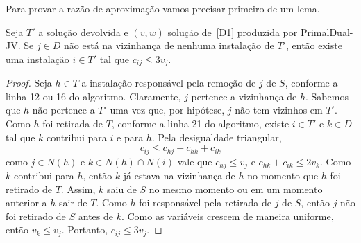 Para provar a razão de aproximação vamos precisar primeiro de um lema.
\begin{lemma}
    \label{lemma:3.5}
    Seja $T'$ a solução devolvida e $(v,w)$ solução de~\eqref{D1} produzida por {\sc PrimalDual-JV}. Se $j \in D$ não está na vizinhança de nenhuma instalação de $T'$, então existe uma instalação $i \in T'$ tal que $c_{ij} \leq 3v_j$.
\end{lemma}
\begin{proof}
    Seja $h \in T$ a instalação responsável pela remoção de $j$ de $S$, conforme a linha 12 ou 16 do algoritmo. Claramente, $j$ pertence a vizinhança de $h$. Sabemos que $h$ não pertence a $T'$ uma vez que, por hipótese, $j$ não tem vizinhos em $T'$. Como $h$ foi retirada de $T$, conforme a linha 21 do algoritmo, existe $i \in T'$ e $k \in D$ tal que $k$ contribui para $i$ e para $h$. Pela desigualdade triangular,
    \[c_{ij} \leq c_{hj} + c_{hk} + c_{ik}\]
    como $j \in N(h)$ e $k \in N(h) \cap N(i)$ vale que $c_{hj} \leq v_j$ e $c_{hk} + c_{ik} \leq 2v_k$. Como $k$ contribui para $h$, então $k$ já estava na vizinhança de $h$ no momento que $h$ foi retirado de $T$. Assim, $k$ saiu de $S$ no mesmo momento ou em um momento anterior a $h$ sair de $T$. Como $h$ foi responsável pela retirada de $j$ de $S$, então $j$ não foi retirado de $S$ antes de $k$. Como as variáveis crescem de maneira uniforme, então $v_k \leq v_j$. 
    Portanto, $c_{ij}\leq 3v_j$. 
\end{proof}


